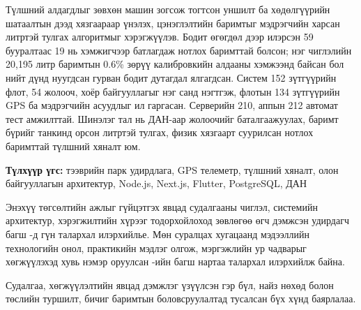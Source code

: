 \documentclass[
12pt,
oneside,
english,
onehalfspacing,
nolistspacing,
headsepline,
]{MUST-Thesis}
\newcommand{\acknowledgementname}{Талархал}
\begin{document}
Түлшний алдагдлыг зөвхөн машин зогсож тогтсон уншилт ба хөдөлгүүрийн шатаалтын дээд хязгаараар үнэлэх, цэнэглэлтийн баримтыг мэдрэгчийн харсан литртэй тулгах алгоритмыг хэрэгжүүлэв. Бодит өгөгдөл дээр илэрсэн 59 бууралтаас 19 нь хэмжигчээр батлагдаж нотлох баримттай болсон; нэг чиглэлийн 20,195 литр баримтын 0.6\% зөрүү калибровкийн алдааны хэмжээнд байсан бол нийт дүнд нуугдсан гурван бодит дутагдал ялгагдсан. Систем 152 зүтгүүрийн флот, 54 жолооч, хоёр байгууллагыг нэг санд нэгтгэж, флотын 134 зүтгүүрийн GPS ба мэдрэгчийн асуудлыг ил гаргасан. Серверийн 210, аппын 212 автомат тест амжилттай. Шинэлэг тал нь ДАН-аар жолоочийг баталгаажуулах, баримт бүрийг танкинд орсон литртэй тулгах, физик хязгаарт суурилсан нотлох баримттай түлшний хяналт юм.

\textbf{Түлхүүр үгс:} тээврийн парк удирдлага, GPS телеметр, түлшний хяналт, олон байгууллагын архитектур, Node.js, Next.js, Flutter, PostgreSQL, ДАН

\begin{acknowledgements}
\addchaptertocentry{\acknowledgementname}

Энэхүү төгсөлтийн ажлыг гүйцэтгэх явцад судалгааны чиглэл, системийн архитектур, хэрэгжилтийн хүрээг тодорхойлоход зөвлөгөө өгч дэмжсэн удирдагч багш \supname-д гүн талархал илэрхийлье. Мөн суралцах хугацаанд мэдээллийн технологийн онол, практикийн мэдлэг олгож, мэргэжлийн ур чадварыг хөгжүүлэхэд хувь нэмэр оруулсан \facname-ийн багш нартаа талархал илэрхийлж байна.

Судалгаа, хөгжүүлэлтийн явцад дэмжлэг үзүүлсэн гэр бүл, найз нөхөд болон төслийн туршилт, бичиг баримтын боловсруулалтад тусалсан бүх хүнд баярлалаа.

\end{acknowledgements}
\end{document}
